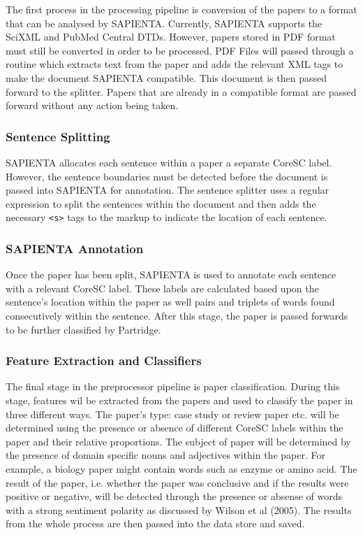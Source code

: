 The first process in the processing pipeline is conversion of the papers to a
format that can be analysed by SAPIENTA. Currently, SAPIENTA supports the
SciXML\cite{rupp2006flexible} and PubMed Central\cite{pubmedDTD} DTDs. However,
papers stored in PDF format must still be converted in order to be processed.
PDF Files will passed through a routine which extracts text from the paper and
adds the relevant XML tags to make the document SAPIENTA compatible. This
document is then passed forward to the splitter. Papers that are already in a
compatible format are passed forward without any action being taken.

\subsubsection{Sentence Splitting} 

SAPIENTA allocates each sentence within a paper a separate CoreSC label.
However, the sentence boundaries must be detected before the document is passed
into SAPIENTA for annotation. The sentence splitter uses a regular expression
to split the sentences within the document and then adds the necessary
\verb|<s>| tags to the markup to indicate the location of each sentence.

\subsubsection{SAPIENTA Annotation}

Once the paper has been split, SAPIENTA is used to annotate each sentence with
a relevant CoreSC label. These labels are calculated based upon the
sentence's location within the paper as well pairs and triplets of words found
consecutively within the sentence. After this stage, the paper is passed
forwards to be further classified by Partridge.


\subsubsection{Feature Extraction and Classifiers}

The final stage in the preprocessor pipeline is paper classification. During
this stage, features wil be extracted from the papers and used to classify the
paper in three different ways. The paper's type: case study or review paper
etc. will be determined using the presence or absence of different CoreSC labels
within the paper and their relative proportions. The subject of paper will be
determined by the presence of domain specific nouns and adjectives within the
paper. For example, a biology paper might contain words such as enzyme or amino
acid. The result of the paper, i.e. whether the paper was conclusive and if the
results were positive or negative, will be detected through the presence or absense
of words with a strong sentiment polarity as discussed by Wilson et al
(2005)\cite{Wilson05Polarity}. The results from the whole process are then
passed into the data store and saved.

